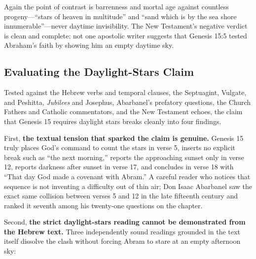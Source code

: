Again the point of contrast is barrenness and mortal age against countless progeny---``stars of heaven in multitude'' and ``sand which is by the sea shore innumerable''---never daytime invisibility. The New Testament's negative verdict is clean and complete: not one apostolic writer suggests that Genesis 15:5 tested Abraham's faith by showing him an empty daytime sky.

\subsection{Evaluating the Daylight-Stars Claim}

Tested against the Hebrew verbs and temporal clauses, the Septuagint, Vulgate, and Peshitta, \emph{Jubilees} and Josephus, Abarbanel's prefatory questions, the Church Fathers and Catholic commentators, and the New Testament echoes, the claim that Genesis 15 requires daylight stars breaks cleanly into four findings.

First, \textbf{the textual tension that sparked the claim is genuine.} Genesis 15 truly places God's command to count the stars in verse 5, inserts no explicit break such as ``the next morning,'' reports the approaching sunset only in verse 12, reports darkness after sunset in verse 17, and concludes in verse 18 with ``That day God made a covenant with Abram.'' A careful reader who notices that sequence is not inventing a difficulty out of thin air; Don Isaac Abarbanel saw the exact same collision between verses 5 and 12 in the late fifteenth century and ranked it seventh among his twenty-one questions on the chapter.

Second, \textbf{the strict daylight-stars reading cannot be demonstrated from the Hebrew text.} Three independently sound readings grounded in the text itself dissolve the clash without forcing Abram to stare at an empty afternoon sky:

